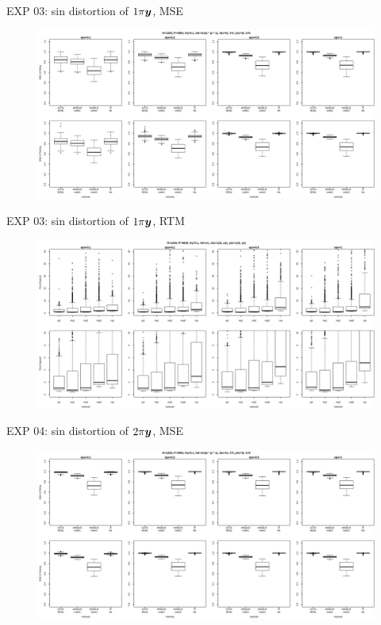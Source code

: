 \documentclass{beamer}
\begin{document}
\begin{frame}{EXP 03: sin distortion of $1\pi\boldsymbol{y}$, MSE}
  \begin{figure}\includegraphics[width=1.00\linewidth]{s03_bxp.png}\end{figure}
\end{frame}
\begin{frame}{EXP 03: sin distortion of $1\pi\boldsymbol{y}$, RTM}
  \begin{figure}\includegraphics[width=1.00\linewidth]{t03_bxp.png}\end{figure}
\end{frame}
\begin{frame}{EXP 04: sin distortion of $2\pi\boldsymbol{y}$, MSE}
  \begin{figure}\includegraphics[width=1.00\linewidth]{s04_bxp.png}\end{figure}
\end{frame}
\end{document}
